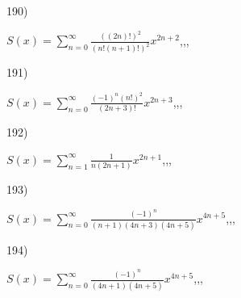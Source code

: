 \documentclass[11pt, ukrainian]{article}
\begin{document}
\par
\vspace{0.9cm}
190) \space 
{%
{$S(x)=\sum\limits_{n=0}^{\infty}{\frac{((2n)!)^2}{(n!(n+1)!)^2}}{x^{{2n+2}}}$},,, \par \smallskip  
}
\par
\newpage
191) \space 
{%
{$S(x)=\sum\limits_{n=0}^{\infty}{\frac{{(-1)^n}{(n!)^2}}{(2n+3)!}}{x^{{2n+3}}}$},,, \par \smallskip  
}
\par
\vspace{0.9cm}
192) \space 
{%
{$S(x)=\sum\limits_{n=1}^{\infty}{\frac{1}{n(2n+1)}}{x^{{2n+1}}}$},,, \par \smallskip  
}
\par
\vspace{0.9cm}
193) \space 
{%
{$S(x)=\sum\limits_{n=0}^{\infty}{\frac{(-1)^n}{(n+1)(4n+3)(4n+5)}}{x^{{4n+5}}}$},,, \par \smallskip  
}
\par
\vspace{0.9cm}
194) \space 
{%
{$S(x)=\sum\limits_{n=0}^{\infty}{\frac{(-1)^n}{(4n+1)(4n+5)}}{x^{{4n+5}}}$},,, \par \smallskip  
}
\par
\vspace{0.9cm}
\end{document}
